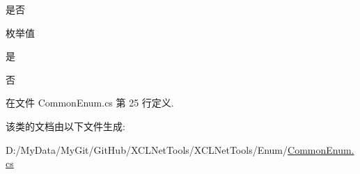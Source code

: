 是否 

\begin{Desc}
\item[枚举值]\par
\begin{description}
\item[{\em 
\hypertarget{class_x_c_l_net_tools_1_1_enum_1_1_common_enum_a5940e298dc09411c8a238f4f4e94e633a0a60ac8f02ccd2cf723f927284877851}{是}\label{class_x_c_l_net_tools_1_1_enum_1_1_common_enum_a5940e298dc09411c8a238f4f4e94e633a0a60ac8f02ccd2cf723f927284877851}
}]是 \item[{\em 
\hypertarget{class_x_c_l_net_tools_1_1_enum_1_1_common_enum_a5940e298dc09411c8a238f4f4e94e633ac9744f45e76d885ae1c74d4f4a934b2e}{否}\label{class_x_c_l_net_tools_1_1_enum_1_1_common_enum_a5940e298dc09411c8a238f4f4e94e633ac9744f45e76d885ae1c74d4f4a934b2e}
}]否 \end{description}
\end{Desc}


在文件 Common\-Enum.\-cs 第 25 行定义.



该类的文档由以下文件生成\-:\begin{DoxyCompactItemize}
\item 
D\-:/\-My\-Data/\-My\-Git/\-Git\-Hub/\-X\-C\-L\-Net\-Tools/\-X\-C\-L\-Net\-Tools/\-Enum/\hyperlink{_common_enum_8cs}{Common\-Enum.\-cs}\end{DoxyCompactItemize}
